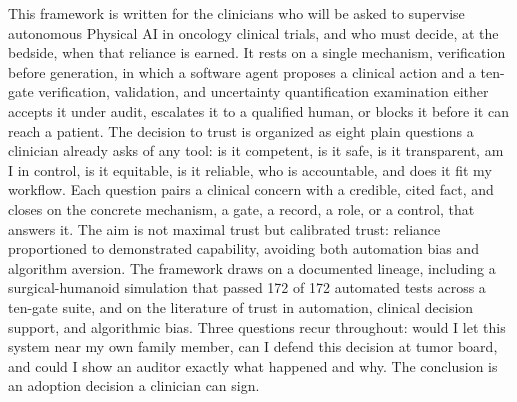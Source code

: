 This framework is written for the clinicians who will be asked to supervise
autonomous Physical AI in oncology clinical trials, and who must decide, at the
bedside, when that reliance is earned. It rests on a single mechanism, verification
before generation, in which a software agent proposes a clinical action and a
ten-gate verification, validation, and uncertainty quantification examination
either accepts it under audit, escalates it to a qualified human, or blocks it
before it can reach a patient. The decision to trust is organized as eight plain
questions a clinician already asks of any tool: is it competent, is it safe, is it
transparent, am I in control, is it equitable, is it reliable, who is accountable,
and does it fit my workflow. Each question pairs a clinical concern with a
credible, cited fact, and closes on the concrete mechanism, a gate, a record, a
role, or a control, that answers it. The aim is not maximal trust but calibrated
trust: reliance proportioned to demonstrated capability, avoiding both automation
bias and algorithm aversion. The framework draws on a documented lineage, including a surgical-humanoid simulation that passed 172 of 172
automated tests across a ten-gate suite, and on the literature of trust in
automation, clinical decision support, and algorithmic bias. Three questions recur
throughout: would I let this system near my own family member, can I defend this
decision at tumor board, and could I show an auditor exactly what happened and why.
The conclusion is an adoption decision a clinician can sign.
